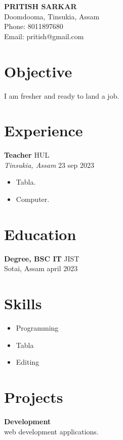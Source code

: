 \documentclass[a4paper,22pt]{article}
\begin{document}
\begin{center}
    {\LARGE \textbf{PRITISH SARKAR}} \\
    Doomdooma, Tinsukia, Assam \\
    Phone: 8011897680 \\
    Email: pritish@gmail.com \\
\end{center}


\section*{Objective}
I am fresher and ready to land a job.


\section*{Experience}
\textbf{Teacher} \hfill HUL \\
\textit{Tinsukia, Assam} \hfill 23 sep 2023 \\
\begin{itemize}[noitemsep]
    \item Tabla.
    \item Computer.
\end{itemize}


\section*{Education}
\textbf{Degree, BSC IT} \hfill JIST \\
Sotai, Assam \hfill april 2023


\section*{Skills}
\begin{itemize}[noitemsep]
    \item Programming
    \item Tabla
    \item Editing
\end{itemize}


\section*{Projects}
\textbf{Development} \\
web development applications.
\end{document}
